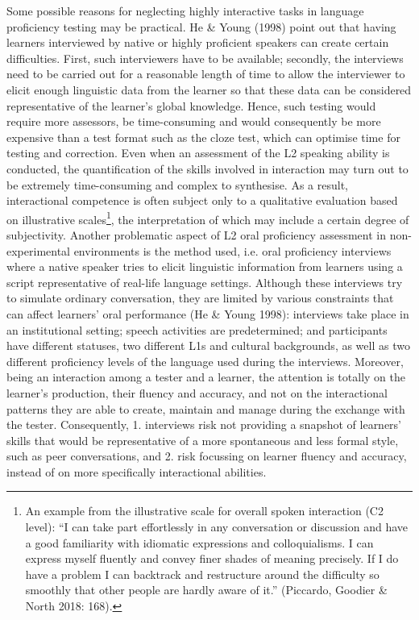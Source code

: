 \begin{styleStandard}
Some possible reasons for neglecting highly interactive tasks in language proficiency testing may be practical. He \& Young (1998) point out that having learners interviewed by native or highly proficient speakers can create certain difficulties. First, such interviewers have to be available; secondly, the interviews need to be carried out for a reasonable length of time to allow the interviewer to elicit enough linguistic data from the learner so that these data can be considered representative of the learner’s global knowledge. Hence, such testing would require more assessors, be time-consuming and would consequently be more expensive than a test format such as the cloze test, which can optimise time for testing and correction. Even when an assessment of the L2 speaking ability is conducted, the quantification of the skills involved in interaction may turn out to be extremely time-consuming and complex to synthesise. As a result, interactional competence is often subject only to a qualitative evaluation based on illustrative scales\footnote{An example from the illustrative scale for overall spoken interaction (C2 level): “I can take part effortlessly in any conversation or discussion and have a good familiarity with idiomatic expressions and colloquialisms. I can express myself fluently and convey finer shades of meaning precisely. If I do have a problem I can backtrack and restructure around the difficulty so smoothly that other people are hardly aware of it.” (Piccardo, Goodier \& North 2018: 168).\par }, the interpretation of which may include a certain degree of subjectivity. Another problematic aspect of L2 oral proficiency assessment in non-experimental environments is the method used, i.e. oral proficiency interviews where a native speaker tries to elicit linguistic information from learners using a script representative of real-life language settings. Although these interviews try to simulate ordinary conversation, they are limited by various constraints that can affect learners’ oral performance (He \& Young 1998): interviews take place in an institutional setting; speech activities are predetermined; and participants have different statuses, two different L1s and cultural backgrounds, as well as two different proficiency levels of the language used during the interviews. Moreover, being an interaction among a tester and a learner, the attention is totally on the learner’s production, their fluency and accuracy, and not on the interactional patterns they are able to create, maintain and manage during the exchange with the tester. Consequently, 1. interviews risk not providing a snapshot of learners’ skills that would be representative of a more spontaneous and less formal style, such as peer conversations, and 2. risk focussing on learner fluency and accuracy, instead of on more specifically interactional abilities.
\end{styleStandard}

